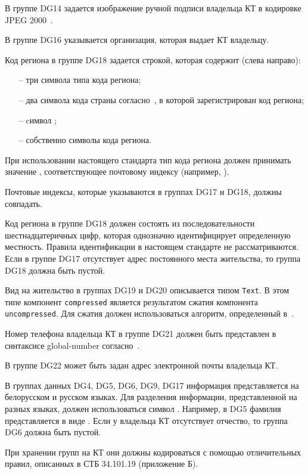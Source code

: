 В группе DG14 задается изображение ручной подписи
владельца КТ в кодировке JPEG 2000~\cite{JPEG2000}.

В группе DG16 указывается организация, которая выдает КТ владельцу. 

Код региона в группе DG18 задается строкой, которая содержит (слева направо):
\begin{itemize}
\item[--]
три символа типа кода региона;
\item[--]
два символа кода страны согласно~\cite{CountryCodes}, в которой зарегистрирован 
код региона;
\item[--]
cимвол \str{-}; 
\item[--]
собственно символы кода региона.
\end{itemize}

При использовании настоящего стандарта тип кода региона
должен принимать значение , соответствующее
почтовому индексу (например, ).

Почтовые индексы, которые указываются в группах DG17 и DG18,
должны совпадать.

Код региона в группе DG18 должен состоять из последовательности 
шестнадцатеричных цифр, которая однозначно идентифицирует определенную 
местность. Правила идентификации в настоящем стандарте не рассматриваются. 
Если в группе DG17 отсутствует адрес постоянного места жительства, то 
группа DG18 должна быть пустой. 
\fi


Вид на жительство в группах DG19 и DG20 описывается типом \verb|Text|. 
В этом типе компонент \verb|compressed| является результатом сжатия компонента 
\verb|uncompressed|. Для сжатия должен использоваться алгоритм, 
определенный в~\cite{DEFLATE}. 
\fi

Номер телефона владельца КТ в группе DG21 должен быть
представлен в синтаксисе global-number согласно~\cite{RFC3966}. 

В группе DG22 может быть задан адрес электронной почты владельца КТ. 

В группах данных DG4, DG5, DG6, DG9, DG17 информация
представляется на белорусском и русском языках.
Для разделения информации, представленной на разных языках,
должен использоваться символ \str{/}. Например, в DG5 фамилия 
представляется в виде .
Если у владельца КТ отсутствует отчество, то группа DG6 должна быть пустой. 

При хранении групп на КТ они должны кодироваться с помощью отличительных 
правил, описанных в СТБ 34.101.19 (приложение Б). 

